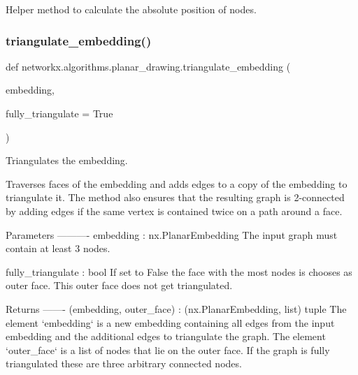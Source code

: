 \begin{DoxyVerb}Helper method to calculate the absolute position of nodes.\end{DoxyVerb}
 \mbox{\label{namespacenetworkx_1_1algorithms_1_1planar__drawing_a08ac4a90fdc11925daf5b94ed0789ac3}} 
\subsubsection{\texorpdfstring{triangulate\+\_\+embedding()}{triangulate\_embedding()}}
{\footnotesize\ttfamily def networkx.\+algorithms.\+planar\+\_\+drawing.\+triangulate\+\_\+embedding (\begin{DoxyParamCaption}\item[{}]{embedding,  }\item[{}]{fully\+\_\+triangulate = {\ttfamily True} }\end{DoxyParamCaption})}

\begin{DoxyVerb}Triangulates the embedding.

Traverses faces of the embedding and adds edges to a copy of the
embedding to triangulate it.
The method also ensures that the resulting graph is 2-connected by adding
edges if the same vertex is contained twice on a path around a face.

Parameters
----------
embedding : nx.PlanarEmbedding
    The input graph must contain at least 3 nodes.

fully_triangulate : bool
    If set to False the face with the most nodes is chooses as outer face.
    This outer face does not get triangulated.

Returns
-------
(embedding, outer_face) : (nx.PlanarEmbedding, list) tuple
    The element `embedding` is a new embedding containing all edges from
    the input embedding and the additional edges to triangulate the graph.
    The element `outer_face` is a list of nodes that lie on the outer face.
    If the graph is fully triangulated these are three arbitrary connected
    nodes.\end{DoxyVerb}
 \mbox{\label{namespacenetworkx_1_1algorithms_1_1planar__drawing_ade5ec6675aba9215ee603d9eec914f79}} 
